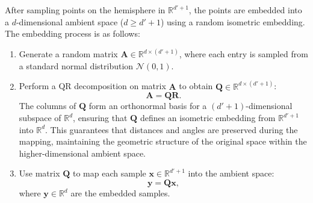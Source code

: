 After sampling points on the hemisphere in $\mathbb{R}^{d'+1}$, the points are embedded into a $d$-dimensional ambient space ($d \geq d'+1$) using a random isometric embedding. The embedding process is as follows:

\begin{enumerate}
    \item Generate a random matrix $\mathbf{A} \in \mathbb{R}^{d \times (d'+1)}$, where each entry is sampled from a standard normal distribution $\mathcal{N}(0, 1)$.
    \item Perform a QR decomposition on matrix $\mathbf{A}$ to obtain $\mathbf{Q} \in \mathbb{R}^{d \times (d'+1)}$:
    \[
    \mathbf{A} = \mathbf{Q} \mathbf{R}.
    \]
    The columns of \( \mathbf{Q} \) form an orthonormal basis for a \((d'+1)\)-dimensional subspace of \( \mathbb{R}^d \), ensuring that \( \mathbf{Q} \) defines an isometric embedding from \( \mathbb{R}^{d'+1} \) into \( \mathbb{R}^d \). This guarantees that distances and angles are preserved during the mapping, maintaining the geometric structure of the original space within the higher-dimensional ambient space.

    \item Use matrix $\mathbf{Q}$ to map each sample $\mathbf{x} \in \mathbb{R}^{d'+1}$ into the ambient space:
    \[
    \mathbf{y} = \mathbf{Q}\mathbf{x},
    \]
    where $\mathbf{y} \in \mathbb{R}^d$ are the embedded samples.
\end{enumerate}

